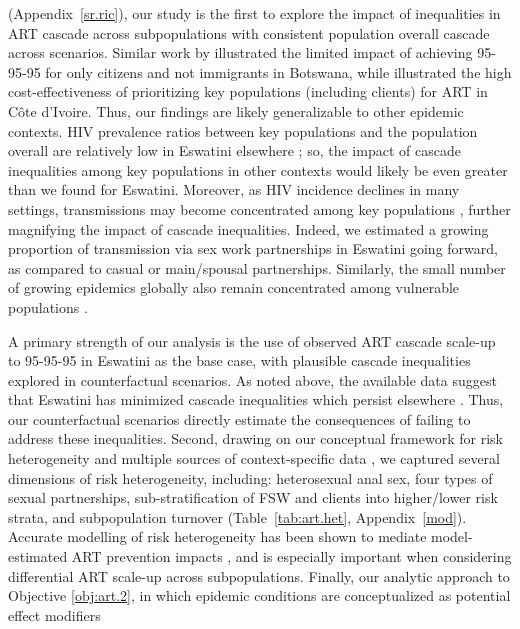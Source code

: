 \cite{Knight2022sr} (Appendix~\ref{sr.ric}),
our study is the first to explore the impact of
inequalities in ART cascade across subpopulations
with consistent population overall cascade across scenarios.
Similar work by \citet{Marukutira2020} illustrated the limited impact of
achieving 95-95-95 for only citizens and not immigrants in Botswana,
while \citet{Maheu-Giroux2019cost} illustrated the high cost-effectiveness of
prioritizing key populations (including clients) for ART in C\^{o}te d'Ivoire.
Thus, our findings are likely generalizable to other epidemic contexts.
HIV prevalence ratios between key populations and the population overall
are relatively low in Eswatini \vs elsewhere \cite{Baral2012,Hessou2019};
so, the impact of cascade inequalities among key populations in other contexts
would likely be even greater than we found for Eswatini.
Moreover, as HIV incidence declines in many settings,
transmissions may become concentrated among key populations \cite{Brown2019,Garnett2021},
further magnifying the impact of cascade inequalities.
Indeed, we estimated a growing proportion of transmission
via sex work partnerships in Eswatini going forward,
as compared to casual or main/spousal partnerships.
Similarly, the small number of growing epidemics globally
also remain concentrated among vulnerable populations \cite{UNAIDS2023}.
\par
A primary strength of our analysis is the use of
observed ART cascade scale-up to 95-95-95 in Eswatini as the base case,
with plausible cascade inequalities explored in counterfactual scenarios.
As noted above, the available data suggest that Eswatini has
minimized cascade inequalities which persist elsewhere \cite{Hakim2018}.
Thus, our counterfactual scenarios directly estimate
the consequences of failing to address these inequalities.
Second, drawing on our conceptual framework for risk heterogeneity \cite[Table~1]{Knight2022sr}
and multiple sources of context-specific data
\cite{SDHS2006,SHIMS1,SHIMS2,Baral2014,EswKP2014,EswIBBS2022},
we captured several dimensions of risk heterogeneity, including:
heterosexual anal sex,
four types of sexual partnerships,
sub-stratification of FSW and clients into higher/lower risk strata,
and subpopulation turnover
(Table~\ref{tab:art.het}, Appendix~\ref{mod}).
Accurate modelling of risk heterogeneity
has been shown to mediate model-estimated ART prevention impacts \cite{Hontelez2013},
and is especially important when considering differential ART scale-up across subpopulations.
Finally, our analytic approach to Objective \ref{obj:art.2},
in which epidemic conditions are conceptualized as potential effect modifiers
